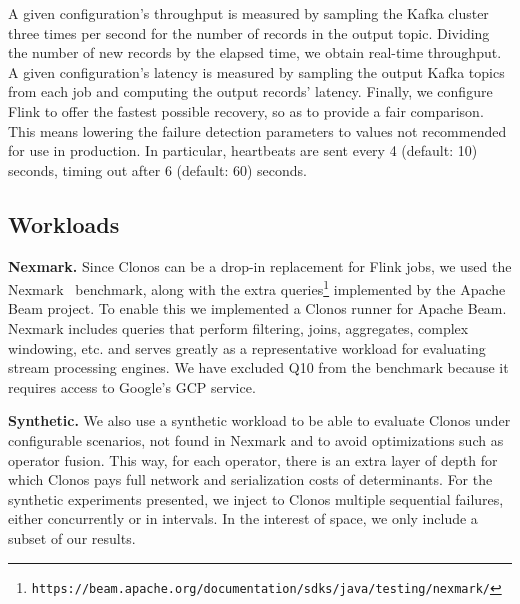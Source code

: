 \documentclass[sigconf]{acmart}
\newcommand{\para}[1]{\vspace{1mm}\noindent\textbf{#1.}}
\begin{document}
A given configuration's throughput is measured by sampling the Kafka cluster three times per second for the number of records in the output topic. Dividing the number of new records by the elapsed time, we obtain real-time throughput.
A given configuration's latency is measured by sampling the output Kafka topics from each job and computing the output records' latency.
Finally, we configure Flink to offer the fastest possible recovery, so as to provide a fair comparison. This means lowering the failure detection parameters to values not recommended for use in production. In particular, heartbeats are sent every 4 (default: 10) seconds, timing out after 6 (default: 60) seconds.

\subsection{Workloads}
\para{Nexmark} Since Clonos can be a drop-in replacement for Flink jobs, we used the Nexmark~\cite{tucker2008nexmark} benchmark, along with the extra queries\footnote{\texttt{https://beam.apache.org/documentation/sdks/java/testing/nexmark/}} implemented by the Apache Beam project. To enable this we implemented a Clonos runner for Apache Beam. Nexmark includes queries that perform filtering, joins, aggregates, complex windowing, etc. and serves greatly as a representative workload for evaluating stream processing engines. We have excluded Q10 from the benchmark because it requires access to Google's GCP service. 

\para{Synthetic}
We also use a synthetic workload to be able to evaluate Clonos under configurable scenarios, not found in Nexmark and to avoid optimizations such as operator fusion. This way, for each operator, there is an extra layer of depth for which Clonos pays full network and serialization costs of determinants. 
For the synthetic experiments presented, we inject to Clonos multiple sequential failures, either concurrently or in intervals. In the interest of space, we only include a subset of our results.
\end{document}
